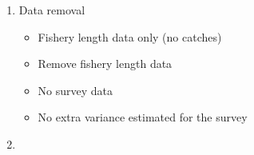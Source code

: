 \documentclass[11pt,
  english,
  a4paper,
]{article}
\begin{document}
\begin{enumerate}
\def\labelenumi{\arabic{enumi}.}
\item

  Data removal

  \tagmcend\tagstructend\tagstructend


  \begin{itemize}
  \item


    Fishery length data only (no catches)

    \tagmcend\tagstructend\tagstructend

    \tagmcend\tagstructend\tagstructend
  \item


    Remove fishery length data

    \tagmcend\tagstructend\tagstructend

    \tagmcend\tagstructend\tagstructend
  \item


    No survey data

    \tagmcend\tagstructend\tagstructend

    \tagmcend\tagstructend\tagstructend
  \item


    No extra variance estimated for the survey

    \tagmcend\tagstructend\tagstructend

    \tagmcend\tagstructend\tagstructend
  \end{itemize}

  \tagstructend
\item


\end{enumerate}
\end{document}
